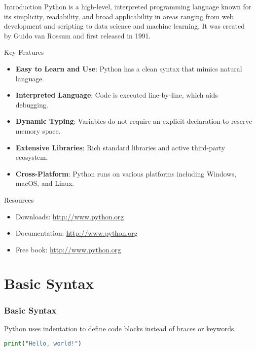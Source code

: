 \begin{frame}{Introduction}
Python is a high-level, interpreted programming language known for its simplicity, readability, and broad applicability in areas ranging from web development and scripting to data science and machine learning. It was created by Guido van Rossum and first released in 1991.
\end{frame}


\begin{frame}[allowframebreaks]{Key Features}
\begin{itemize}
\item \textbf{Easy to Learn and Use}: Python has a clean syntax that mimics natural language.
\item \textbf{Interpreted Language}: Code is executed line-by-line, which aids debugging.
\item \textbf{Dynamic Typing}: Variables do not require an explicit declaration to reserve memory space.
\item \textbf{Extensive Libraries}: Rich standard libraries and active third-party ecosystem.
\item \textbf{Cross-Platform}: Python runs on various platforms including Windows, macOS, and Linux.
\end{itemize}
\end{frame}



\begin{frame}{Resources}
\begin{itemize}
\item
Downloads:
\url{http://www.python.org}
\item
Documentation:
\url{http://www.python.org}
\item Free book:
\url{http://www.python.org}
\end{itemize}
\end{frame}



\section{Basic Syntax}
\begin{frame}[plain]
\sectionpage
\end{frame}


\begin{frame}[fragile]
\frametitle{Basic Syntax}
Python uses indentation to define code blocks instead of braces or keywords.

\begin{lstlisting}[language=python]
print("Hello, world!")
\end{lstlisting}
\end{frame}

